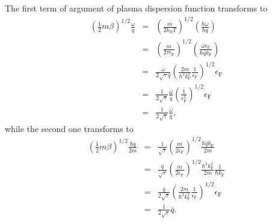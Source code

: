 \documentclass[aps,showkeys,noshowpacs,superscriptaddress,pre,preprint]{revtex4-2}
\begin{document}
The first term of argument of plasma dispersion function transforms to
\begin{eqnarray*}
\left( \frac{1}{2} m \beta \right)^{1/2} \frac{\omega}{q}
&=& \left( \frac{m}{2 k_\mathrm{B} T} \right)^{1/2} \left( \frac{\hbar \omega}{\hbar q} \right)
\\
&=& \left( \frac{m}{2 \tau \epsilon_\mathrm{F} } \right)^{1/2}
\left( \frac{\bar{\omega} \epsilon_\mathrm{F} }{\hbar \bar{q} k_\mathrm{F}} \right)
\\
&=& \frac{\bar{\omega}}{2 \sqrt{\tau} \bar{q}}
\left( \frac{2 m}{\hbar^2 k_\mathrm{F}^2} \frac{1}{\epsilon_\mathrm{F}} \right)^{1/2} \epsilon_\mathrm{F}
\\
&=& \frac{1}{2 \sqrt{\tau}} \frac{\bar{\omega}}{\bar{q}}
 \left( \frac{1}{\epsilon_\mathrm{F}^2} \right)^{1/2} \epsilon_\mathrm{F}
\\
&=& \frac{1}{2 \sqrt{\tau}} \frac{\bar{\omega}}{\bar{q}} ,
\end{eqnarray*}
while the second one transforms to
\begin{eqnarray*}
\left( \frac{1}{2} m \beta \right)^{1/2} \frac{\hbar q}{2 m} 
&=& \frac{1}{\sqrt{\tau}} \left( \frac{m}{2 \epsilon_\mathrm{F}} \right)^{1/2} 
\frac{\hbar \bar{q} k_\mathrm{F} }{2 m}
\\
&=& \frac{\bar{q}}{\sqrt{\tau}} \left( \frac{m}{2 \epsilon_\mathrm{F}} \right)^{1/2} 
\frac{\hbar^2 k_\mathrm{F}^2}{2m} \frac{1}{\hbar k_\mathrm{F}}
\\
&=& \frac{\bar{q}}{2 \sqrt{\tau}} \left( \frac{2 m}{\hbar^2 k_\mathrm{F}^2} \frac{1}{\epsilon_\mathrm{F}} \right)^{1/2}
\epsilon_\mathrm{F}
\\
&=& \frac{1}{2 \sqrt{\tau}} \bar{q}.
\end{eqnarray*}
\end{document}
